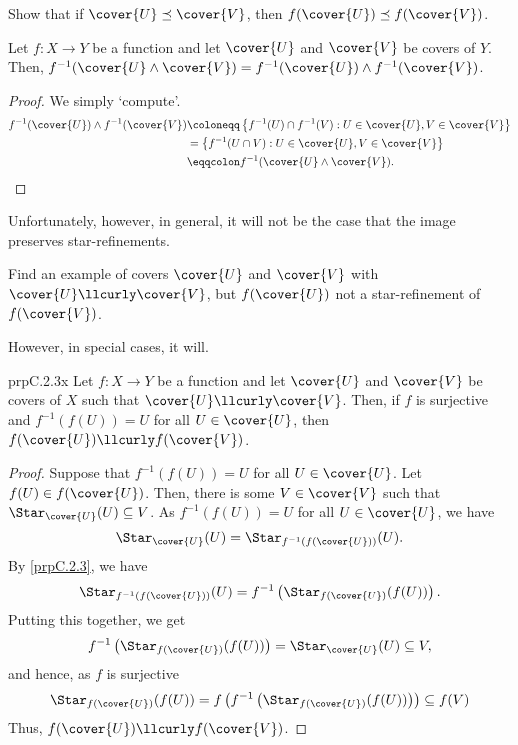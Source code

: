\begin{exr}{}{}
Show that if $\cover{U}\preceq \cover{V}$, then $f(\cover{U})\preceq f(\cover{V})$.
\end{exr}
\begin{prp}{}{}
Let $f\colon X\rightarrow Y$ be a function and let $\cover{U}$ and $\cover{V}$ be covers of $Y$.  Then, $f^{-1}(\cover{U}\wedge \cover{V})=f^{-1}(\cover{U})\wedge f^{-1}(\cover{V})$.
\begin{proof}
We simply `compute'.
\begin{equation}
\begin{split}
f^{-1}(\cover{U})\wedge f^{-1}(\cover{V}) & \coloneqq \left\{ f^{-1}(U)\cap f^{-1}(V):U\in \cover{U},V\in \cover{V}\right\} \\
& =\left\{ f^{-1}(U\cap V):U\in \cover{U},V\in \cover{V}\right\} \\
& \eqqcolon f^{-1}(\cover{U}\wedge \cover{V}).
\end{split}
\end{equation}
\end{proof}
\end{prp}
Unfortunately, however, in general, it will not be the case that the image preserves star-refinements.
\begin{exr}{}{}
Find an example of covers $\cover{U}$ and $\cover{V}$ with $\cover{U}\llcurly \cover{V}$, but $f(\cover{U})$ not a star-refinement of $f(\cover{V})$.
\end{exr}
However, in special cases, it will.
\begin{prp}{}{prpC.2.3x}
Let $f\colon X\rightarrow Y$ be a function and let $\cover{U}$ and $\cover{V}$ be covers of $X$ such that $\cover{U}\llcurly \cover{V}$.  Then, if $f$ is surjective and $f^{-1}(f(U))=U$ for all $U\in \cover{U}$, then $f(\cover{U})\llcurly f(\cover{V})$.
\begin{proof}
Suppose that $f^{-1}(f(U))=U$ for all $U\in \cover{U}$.  Let $f(U)\in f(\cover{U})$.  Then, there is some $V\in \cover{V}$ such that $\Star _{\cover{U}}(U)\subseteq V$.  As $f^{-1}(f(U))=U$ for all $U\in \cover{U}$, we have
\begin{equation}
\Star _{\cover{U}}(U)=\Star _{f^{-1}(f(\cover{U}))}(U).
\end{equation}
By \cref{prpC.2.3}, we have
\begin{equation}
\Star _{f^{-1}(f(\cover{U}))}(U)=f^{-1}\left( \Star _{f(\cover{U})}(f(U))\right) .
\end{equation}
Putting this together, we get
\begin{equation}
f^{-1}\left( \Star _{f(\cover{U})}(f(U))\right) =\Star _{\cover{U}}(U)\subseteq V,
\end{equation}
and hence, as $f$ is surjective
\begin{equation}
\Star _{f(\cover{U})}(f(U))=f\left( f^{-1}\left( \Star _{f(\cover{U})}(f(U))\right) \right) \subseteq f(V)
\end{equation}
Thus, $f(\cover{U})\llcurly f(\cover{V})$.
\end{proof}
\end{prp}

